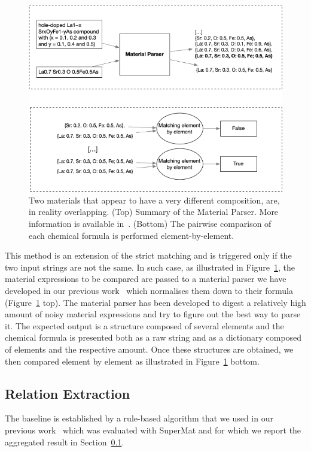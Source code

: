 \documentclass[a4paper]{article}
\begin{document}
\begin{figure}[ht]
  \centering
  \includegraphics[width=1\textwidth]{figures/formula-matching-schema.png} 
  \caption{Two materials that appear to have a very different composition, are, in reality overlapping. (Top) Summary of the Material Parser. More information is available in~\cite{lfoppiano2023automatic}. (Bottom) The pairwise comparison of each chemical formula is performed element-by-element.  }
  \label{fig:formula-matching-schema}
\end{figure}

This method is an extension of the strict matching and is triggered only if the two input strings are not the same. 
In such case, as illustrated in Figure~\ref{fig:formula-matching-schema}, the material expressions to be compared are passed to a material parser we have developed in our previous work~\cite{lfoppiano2023automatic} which normalises them down to their formula (Figure~\ref{fig:formula-matching-schema} top). 
The material parser has been developed to digest a relatively high amount of noisy material expressions and try to figure out the best way to parse it. 
The expected output is a structure composed of several elements and the chemical formula is presented both as a raw string and as a dictionary composed of elements and the respective amount. 
Once these structures are obtained, we then compared element by element as illustrated in Figure~\ref{fig:formula-matching-schema} bottom.

\subsection{Relation Extraction}
\label{sec:re}
The baseline is established by a rule-based algorithm that we used in our previous work~\cite{lfoppiano2023automatic} which was evaluated with SuperMat and for which we report the aggregated result in Section~\ref{sec:re}. 
\end{document}
